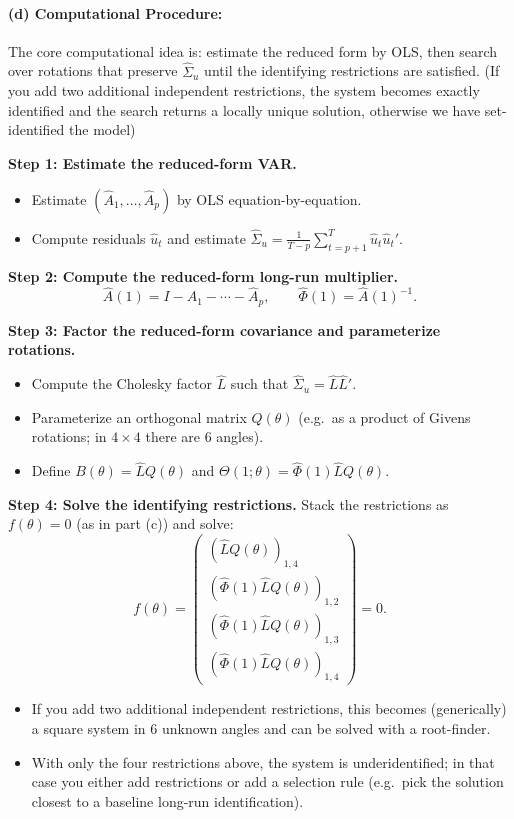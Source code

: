 \documentclass[12pt]{article}
\theoremstyle{definition}
\begin{document}
\bigskip
\paragraph{(d) Computational Procedure:} The core computational idea is: estimate the reduced form by OLS, then search over rotations that preserve $\hat{\Sigma}_u$ until the identifying restrictions are satisfied. (If you add two additional independent restrictions, the system becomes exactly identified and the search returns a locally unique solution, otherwise we have set-identified the model)

\medskip
\noindent \textbf{Step 1: Estimate the reduced-form VAR.}
\begin{itemize}
    \item Estimate $(\hat{A}_1, \ldots, \hat{A}_p)$ by OLS equation-by-equation.
    \item Compute residuals $\hat{u}_t$ and estimate $\hat{\Sigma}_u = \frac{1}{T-p} \sum_{t=p+1}^{T} \hat{u}_t \hat{u}_t'$.
\end{itemize}

\noindent \textbf{Step 2: Compute the reduced-form long-run multiplier.}
\[
\hat{A}(1) = I - \hat{A}_1 - \cdots - \hat{A}_p, \qquad \hat{\Phi}(1) = \hat{A}(1)^{-1}.
\]

\noindent \textbf{Step 3: Factor the reduced-form covariance and parameterize rotations.}
\begin{itemize}
    \item Compute the Cholesky factor $\hat{L}$ such that $\hat{\Sigma}_u=\hat{L}\hat{L}'$.
    \item Parameterize an orthogonal matrix $Q(\theta)$ (e.g.\ as a product of Givens rotations; in $4\times 4$ there are 6 angles).
    \item Define $B(\theta)=\hat{L}Q(\theta)$ and $\Theta(1;\theta)=\hat{\Phi}(1)\hat{L}Q(\theta)$.
\end{itemize}

\noindent \textbf{Step 4: Solve the identifying restrictions.}
Stack the restrictions as $f(\theta)=0$ (as in part (c)) and solve:
\[
f(\theta)=
\begin{pmatrix}
(\hat{L}Q(\theta))_{1,4}\\
(\hat{\Phi}(1)\hat{L}Q(\theta))_{1,2}\\
(\hat{\Phi}(1)\hat{L}Q(\theta))_{1,3}\\
(\hat{\Phi}(1)\hat{L}Q(\theta))_{1,4}
\end{pmatrix}
=0.
\]
\begin{itemize}
    \item If you add two additional independent restrictions, this becomes (generically) a square system in 6 unknown angles and can be solved with a root-finder.
    \item With only the four restrictions above, the system is underidentified; in that case you either add restrictions or add a selection rule (e.g.\ pick the solution closest to a baseline long-run identification).
\end{itemize}
\end{document}
